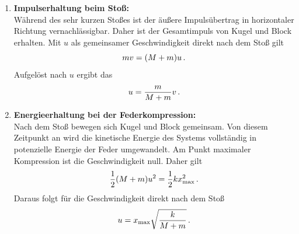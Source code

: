 \documentclass[ngerman]{scrreprt}
\newenvironment{loesungbox}[1]
  {\needspace{5\baselineskip}\begin{loesungboxstyle}[frametitle={#1}]}
  {\end{loesungboxstyle}}
\begin{document}
    \begin{loesungbox}{Lösung zu \Cref{aufg:kugel_block_muendung}}
    \begin{enumerate}
        \item \textbf{Impulserhaltung beim Stoß:} \\
        Während des sehr kurzen Stoßes ist der äußere Impulsübertrag in horizontaler Richtung vernachlässigbar. Daher ist der Gesamtimpuls von Kugel und Block erhalten. Mit $u$ als gemeinsamer Geschwindigkeit direkt nach dem Stoß gilt
        \begin{equation}\label{eq: kugel_block_impuls}
            m v = (M+m)u \,.
        \end{equation}
        Aufgelöst nach $u$ ergibt das
        \begin{equation}\label{eq: kugel_block_u}
            u = \frac{m}{M+m}v \,.
        \end{equation}

        \item \textbf{Energieerhaltung bei der Federkompression:} \\
        Nach dem Stoß bewegen sich Kugel und Block gemeinsam. Von diesem Zeitpunkt an wird die kinetische Energie des Systems vollständig in potenzielle Energie der Feder umgewandelt. Am Punkt maximaler Kompression ist die Geschwindigkeit null. Daher gilt
        \begin{equation}\label{eq: kugel_block_energie}
            \frac{1}{2}(M+m)u^2 = \frac{1}{2}k x_{\text{max}}^2 \,.
        \end{equation}
        Daraus folgt für die Geschwindigkeit direkt nach dem Stoß
        \begin{equation}\label{eq: kugel_block_u_energie}
            u = x_{\text{max}}\sqrt{\frac{k}{M+m}} \,.
        \end{equation}


\end{enumerate}
\end{loesungbox}
\end{document}
